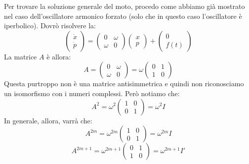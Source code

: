 \documentclass[a4paper,openany]{article}
\begin{document}
	Per trovare la soluzione generale del moto, procedo come abbiamo già mostrato nel caso dell'oscillatore armonico forzato (solo che in questo caso l'oscillatore è iperbolico). Dovrò risolvere la:
	\begin{equation}
		\begin{pmatrix}
			\dot{x} \\ \dot{p}
		\end{pmatrix}
		= 
		\begin{pmatrix}
			0 & \omega \\
			\omega & 0
		\end{pmatrix}
		\begin{pmatrix}
			x \\ p
		\end{pmatrix}
		+ \begin{pmatrix}
			0 \\ f(t)
		\end{pmatrix}
	\end{equation} 
	La matrice $A$ è allora:
	\begin{equation}\label{key}
		A = \begin{pmatrix}
			0 & \omega \\
			\omega & 0
		\end{pmatrix} =
		\omega \begin{pmatrix}
			0 & 1 \\
			1 &0
		\end{pmatrix}
	\end{equation}
	Questa purtroppo non è una matrice antisimmetrica e quindi non riconosciamo un isomorfismo con i numeri complessi. Però notiamo che:
	\begin{equation}\label{key}
		A^2 = \omega^{2} \begin{pmatrix}
			1 & 0 \\
			0 & 1
		\end{pmatrix} = \omega^2 I
	\end{equation}
	In generale, allora, varrà che:
	\begin{equation}
		A^{2m} = \omega^{2m} \begin{pmatrix}
			1 & 0 \\
			0 & 1
		\end{pmatrix}
		= \omega^{2m} I
	\end{equation}
	\begin{equation}
		A^{2m+1} = \omega^{2m+1} \begin{pmatrix}
			0 & 1 \\
			1 &0
		\end{pmatrix}
		= \omega^{2m+1} I'
	\end{equation}
\end{document}
